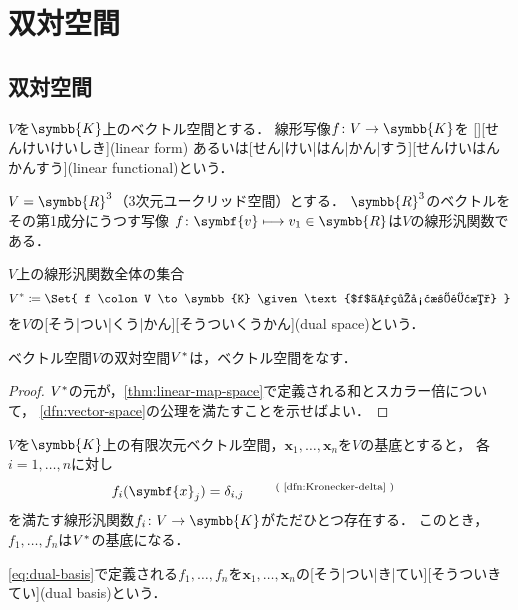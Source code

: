 \documentclass[../sotsu.tex]{subfiles}
\begin{document}
\section{双対空間}

\subsection{双対空間}

\begin{definition}[線形汎関数]
    $V$を$\symbb{K}$上のベクトル空間とする．
    線形写像$f \colon V \to \symbb{K}$を
    [][せんけいけいしき](linear form)
    あるいは[せん|けい|はん|かん|すう][せんけいはんかんすう](linear functional)という．
\end{definition}

\begin{example}
    $V = \symbb{R}^3$（3次元ユークリッド空間）とする．
    $\symbb{R}^3$のベクトルをその第1成分にうつす写像
    $f \colon \symbf{v} \longmapsto v_1 \in \symbb{R}$は$V$の線形汎関数である．
\end{example}


\begin{definition}[双対空間]
    \label{dfn:dual-space}
    $V$上の線形汎関数全体の集合
    \begin{equation}
        \dual{V}  \coloneq  \Set{  f \colon V \to \symbb{K}  \given  \text{$f$は線形汎関数}  }
    \end{equation}
    を$V$の[そう|つい|くう|かん][そうついくうかん](dual space)という\cite[\S 4.1]{saito-lin-2007}．
\end{definition}


\begin{proposition}
    ベクトル空間$V$の双対空間${V}^*$は，ベクトル空間をなす\cite[\S 4.1]{saito-lin-2007}．
\end{proposition}

\begin{proof}
    ${V}^*$の元が，\cref{thm:linear-map-space}で定義される和とスカラー倍について，
    \cref{dfn:vector-space}の公理を満たすことを示せばよい．
\end{proof}


\begin{definition}[双対基底]
    \label{dfn:dual-basis}
    $V$を$\symbb{K}$上の有限次元ベクトル空間，$\symbf{x}_1, \dots, \symbf{x}_n$を$V$の基底とすると，
    各$i = 1, \dots, n$に対し
    \begin{equation}
        \label{eq:dual-basis}
        f_i (\symbf{x}_j) = \delta_{i, j} \quad \text{\refdfn{dfn:Kronecker-delta}}
    \end{equation}
    を満たす線形汎関数$f_i \colon V \to \symbb{K}$がただひとつ存在する．
    このとき，$f_1, \dots, f_n$は${V}^*$の基底になる．

    \cref{eq:dual-basis}で定義される$f_1, \dots, f_n$を$\symbf{x}_1, \dots, \symbf{x}_n$の[そう|つい|き|てい][そうついきてい](dual basis)という．
\end{definition}
\end{document}
